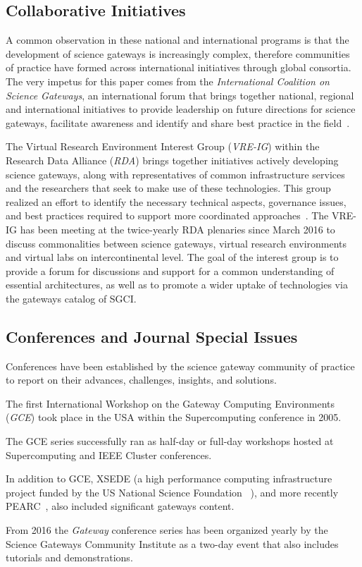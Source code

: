 \documentclass[review]{elsarticle}
\newcommand{\changedtext}[1]{
	{#1}
}
\begin{document}
\subsection{Collaborative Initiatives}

A common observation in these national and international programs is that the development of science gateways is increasingly complex, therefore communities of practice have formed across international initiatives through global consortia. The very impetus for this paper comes from the \emph{International Coalition on Science Gateways}, an international forum that brings together national, regional and international initiatives to provide leadership on future directions for science gateways, facilitate awareness and identify and share best practice in the field~\cite{icsg-23}. 

The Virtual Research Environment Interest Group (\emph{VRE-IG}) within the Research Data Alliance (\emph{RDA}) brings together initiatives actively developing science gateways, along with representatives of common infrastructure services and the researchers that seek to make use of these technologies. This group realized an effort to identify the necessary technical aspects, governance issues, and best practices required to support more coordinated approaches~\cite{rda-vre-ig-24}. 
The VRE-IG has been meeting at the twice-yearly RDA plenaries since March 2016 to discuss commonalities between science gateways, virtual research environments and virtual labs on intercontinental level. The goal of the interest group is to provide a forum for discussions and support for a common understanding of essential architectures, as well as to promote a wider uptake of technologies via the gateways catalog of SGCI.

\subsection{Conferences and Journal Special Issues}

Conferences have been established by the science gateway community of practice to report on their advances, challenges, insights, and solutions.

The first International Workshop on the Gateway Computing Environments (\emph{GCE}) took place in the USA within the Supercomputing conference in 2005. 
\changedtext{The GCE series successfully ran as half-day or full-day workshops hosted at Supercomputing and IEEE Cluster conferences. }
\changedtext{In addition to GCE, XSEDE (a high performance computing infrastructure project funded by the US National Science Foundation ~\cite{xsede-website}), and more recently PEARC~\cite{pearc-website}, also included significant gateways content.} 
From 2016 the \emph{Gateway} conference series has been organized yearly by the Science Gateways Community Institute as a two-day event that also includes tutorials and demonstrations.
\end{document}
